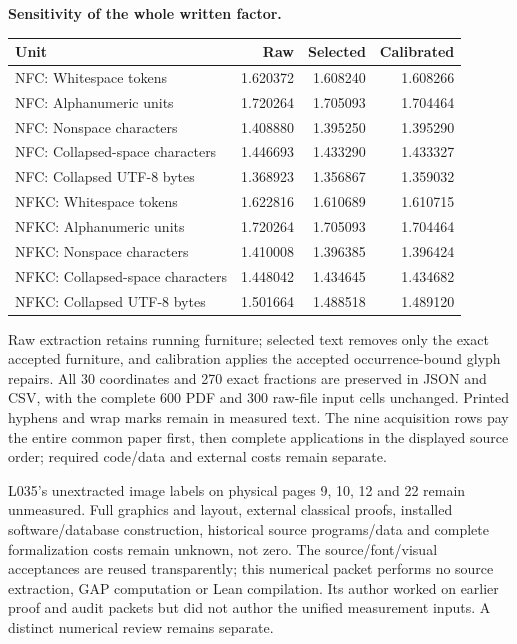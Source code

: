 \documentclass[11pt,a4paper]{article}
\begin{document}
\textbf{Sensitivity of the whole written factor.}
\begin{center}\small\begin{tabular}{lrrr}\toprule
Unit & Raw & Selected & Calibrated\\\midrule
NFC: Whitespace tokens & 1.620372 & 1.608240 & 1.608266\\
NFC: Alphanumeric units & 1.720264 & 1.705093 & 1.704464\\
NFC: Nonspace characters & 1.408880 & 1.395250 & 1.395290\\
NFC: Collapsed-space characters & 1.446693 & 1.433290 & 1.433327\\
NFC: Collapsed UTF-8 bytes & 1.368923 & 1.356867 & 1.359032\\
NFKC: Whitespace tokens & 1.622816 & 1.610689 & 1.610715\\
NFKC: Alphanumeric units & 1.720264 & 1.705093 & 1.704464\\
NFKC: Nonspace characters & 1.410008 & 1.396385 & 1.396424\\
NFKC: Collapsed-space characters & 1.448042 & 1.434645 & 1.434682\\
NFKC: Collapsed UTF-8 bytes & 1.501664 & 1.488518 & 1.489120\\
\bottomrule\end{tabular}\end{center}
Raw extraction retains running furniture; selected text removes only the exact accepted furniture, and calibration applies the accepted occurrence-bound glyph repairs. All 30 coordinates and 270 exact fractions are preserved in JSON and CSV, with the complete 600 PDF and 300 raw-file input cells unchanged. Printed hyphens and wrap marks remain in measured text. The nine acquisition rows pay the entire common paper first, then complete applications in the displayed source order; required code/data and external costs remain separate.

L035's unextracted image labels on physical pages 9, 10, 12 and 22 remain unmeasured. Full graphics and layout, external classical proofs, installed software/database construction, historical source programs/data and complete formalization costs remain unknown, not zero. The source/font/visual acceptances are reused transparently; this numerical packet performs no source extraction, GAP computation or Lean compilation. Its author worked on earlier proof and audit packets but did not author the unified measurement inputs. A distinct numerical review remains separate.
\end{document}

